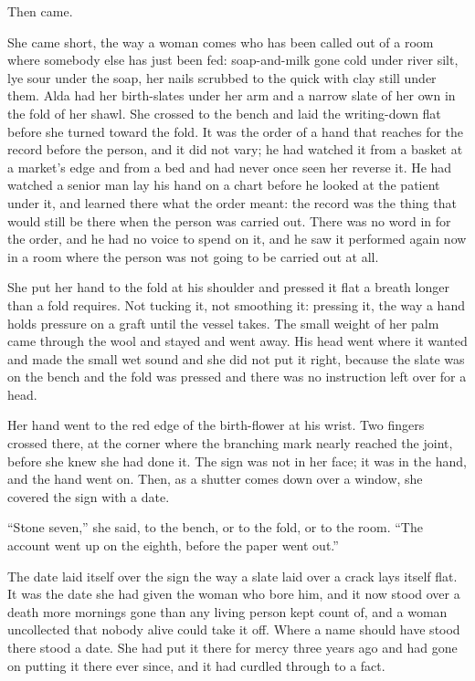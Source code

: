Then  came.

She came short, the way a woman comes who has been called out of a room where somebody else has just been fed: soap-and-milk gone cold under river silt, lye sour under the soap, her nails scrubbed to the quick with clay still under them. Alda had her birth-slates under her arm and a narrow slate of her own in the fold of her shawl. She crossed to the bench and laid the writing-down flat before she turned toward the fold. It was the order of a hand that reaches for the record before the person, and it did not vary; he had watched it from a basket at a market's edge and from a bed and had never once seen her reverse it. He had watched a senior man lay his hand on a chart before he looked at the patient under it, and learned there what the order meant: the record was the thing that would still be there when the person was carried out. There was no word in  for the order, and he had no voice to spend on it, and he saw it performed again now in a room where the person was not going to be carried out at all.

She put her hand to the fold at his shoulder and pressed it flat a breath longer than a fold requires. Not tucking it, not smoothing it: pressing it, the way a hand holds pressure on a graft until the vessel takes. The small weight of her palm came through the wool and stayed and went away. His head went where it wanted and made the small wet sound and she did not put it right, because the slate was on the bench and the fold was pressed and there was no instruction left over for a head.

Her hand went to the red edge of the birth-flower at his wrist. Two fingers crossed there, at the corner where the branching mark nearly reached the joint, before she knew she had done it. The sign was not in her face; it was in the hand, and the hand went on. Then, as a shutter comes down over a window, she covered the sign with a date.

“Stone seven,” she said, to the bench, or to the fold, or to the room. “The account went up on the eighth, before the paper went out.”

The date laid itself over the sign the way a slate laid over a crack lays itself flat. It was the date she had given the woman who bore him, and it now stood over a death more mornings gone than any living person kept count of, and a woman uncollected that nobody alive could take it off. Where a name should have stood there stood a date. She had put it there for mercy three years ago and had gone on putting it there ever since, and it had curdled through to a fact.

